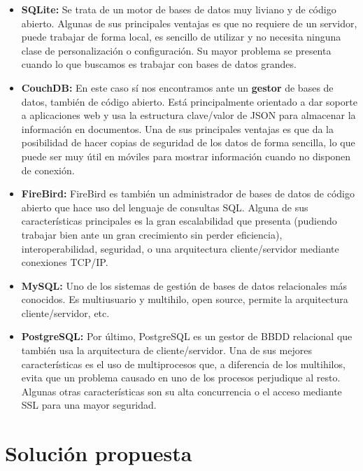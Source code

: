 \begin{itemize}
    \item \textbf{SQLite:} Se trata de un motor de bases de datos muy liviano y de código abierto. Algunas de sus principales ventajas es que no requiere de un servidor, puede trabajar de forma local, es sencillo de utilizar y no necesita ninguna clase de personalización o configuración. Su mayor problema se presenta cuando lo que buscamos es trabajar con bases de datos grandes.
    
    \item \textbf{CouchDB:} En este caso sí nos encontramos ante un \textbf{gestor} de bases de datos, también de código abierto. Está principalmente orientado a dar soporte a aplicaciones web y usa la estructura clave/valor de JSON para almacenar la información en documentos. Una de sus principales ventajas es que da la posibilidad de hacer copias de seguridad de los datos de forma sencilla, lo que puede ser muy útil en móviles para mostrar información cuando no disponen de conexión. 
    
    \item \textbf{FireBird:} FireBird es también un administrador de bases de datos de código abierto que hace uso del lenguaje de consultas SQL. Alguna de sus características principales es la gran escalabilidad que presenta (pudiendo trabajar bien ante un gran crecimiento sin perder eficiencia), interoperabilidad, seguridad, o una arquitectura cliente/servidor mediante conexiones TCP/IP.
    
    \item \textbf{MySQL:} Uno de los sistemas de gestión de bases de datos relacionales más conocidos. Es multiusuario y multihilo, open source, permite la arquitectura cliente/servidor,  etc.
    
    \item \textbf{PostgreSQL:} Por último, PostgreSQL es un gestor de BBDD relacional que también usa la arquitectura de cliente/servidor. Una de sus mejores características es el uso de multiprocesos que, a diferencia de los multihilos, evita que un problema causado en uno de los procesos perjudique al resto. Algunas otras características son su alta concurrencia o el acceso mediante SSL para una mayor seguridad.
\end{itemize}

\section{Solución propuesta}

